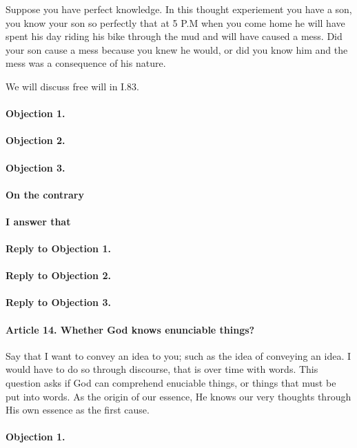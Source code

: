 \documentclass{ucetd}
\begin{document}
Suppose you have perfect knowledge. In this thought experiement you have a son, you know your son so perfectly that at 5 P.M when you come home he will have spent his day riding his bike through the mud and will have caused a mess. Did your son cause a mess because you knew he would, or did you know him and the mess was a consequence of his nature. 

We will discuss free will in I.83.

\paragraph{Objection 1.}
\paragraph{Objection 2.}
\paragraph{Objection 3.}
\paragraph{On the contrary}
\paragraph{I answer that}
\paragraph{Reply to Objection 1.}
\paragraph{Reply to Objection 2.}
\paragraph{Reply to Objection 3.}

\paragraph{Article 14. Whether God knows enunciable things?}
Say that I want to convey an idea to you; such as the idea of conveying an idea. I would have to do so through discourse, that is over time with words. This question asks if God can comprehend enuciable things, or things that must be put into words. As the origin of our essence, He knows our very thoughts through His own essence as the first cause. 
\paragraph{Objection 1.}
\end{document}

